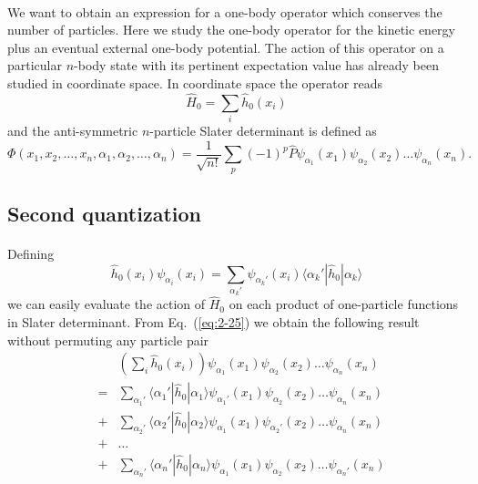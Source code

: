 \documentclass[%
twoside,                 %
final,                   %
10pt]{article}
\begin{document}
\paragraph{}
We want to obtain an expression for a one-body operator which conserves the number of particles.
Here we study the one-body operator for the kinetic energy plus an eventual external one-body potential.
The action of this operator on a particular $n$-body state with its pertinent expectation value has already
been studied in coordinate  space.
In coordinate space the operator reads
\begin{equation}
	\hat{H}_0 = \sum_i \hat{h}_0(x_i) \label{eq:2-23}
\end{equation}
and the anti-symmetric $n$-particle Slater determinant is defined as 
\[
\Phi(x_1, x_2,\dots ,x_n,\alpha_1,\alpha_2,\dots, \alpha_n)= \frac{1}{\sqrt{n!}} \sum_p (-1)^p\hat{P}\psi_{\alpha_1}(x_1)\psi_{\alpha_2}(x_2) \dots \psi_{\alpha_n}(x_n).
\]




\subsection*{Second quantization}

\paragraph{}
Defining
\begin{equation}
	\hat{h}_0(x_i) \psi_{\alpha_i}(x_i) = \sum_{\alpha_k'} \psi_{\alpha_k'}(x_i) \langle\alpha_k'|\hat{h}_0|\alpha_k\rangle \label{eq:2-25}
\end{equation}
we can easily  evaluate the action of $\hat{H}_0$ on each product of one-particle functions in Slater determinant.
From Eq.~(\ref{eq:2-25})  we obtain the following result without  permuting any particle pair 
\begin{eqnarray}
	&& \left( \sum_i \hat{h}_0(x_i) \right) \psi_{\alpha_1}(x_1)\psi_{\alpha_2}(x_2) \dots \psi_{\alpha_n}(x_n) \nonumber \\
	& =&\sum_{\alpha_1'} \langle \alpha_1'|\hat{h}_0|\alpha_1\rangle 
		\psi_{\alpha_1'}(x_1)\psi_{\alpha_2}(x_2) \dots \psi_{\alpha_n}(x_n) \nonumber \\
	&+&\sum_{\alpha_2'} \langle \alpha_2'|\hat{h}_0|\alpha_2\rangle
		\psi_{\alpha_1}(x_1)\psi_{\alpha_2'}(x_2) \dots \psi_{\alpha_n}(x_n) \nonumber \\
	&+& \dots \nonumber \\
	&+&\sum_{\alpha_n'} \langle \alpha_n'|\hat{h}_0|\alpha_n\rangle
		\psi_{\alpha_1}(x_1)\psi_{\alpha_2}(x_2) \dots \psi_{\alpha_n'}(x_n) \label{eq:2-26}
\end{eqnarray}
\end{document}
